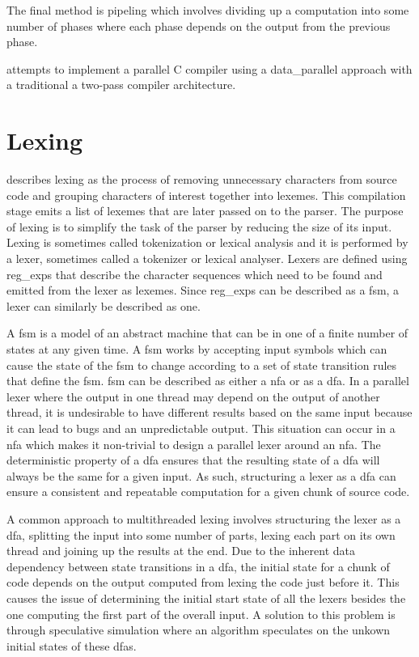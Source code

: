 The final method is pipeling which involves dividing up a computation into some
number of phases where each phase depends on the output from the previous phase.

\cite{mark_thierry_vandevoorde_parallel_1988} attempts to implement a parallel
C compiler using a \gls{data_parallel} approach with a traditional a two-pass
compiler architecture.

\section{Lexing} \label{lit_review_lexing}

\cite{scott_programming_2015} describes lexing as the process of removing
unnecessary characters from source code and grouping characters of interest
together into lexemes. This compilation stage emits a list of lexemes that are
later passed on to the parser. The purpose of lexing is to simplify the task
of the parser by reducing the size of its input. Lexing is sometimes  called
tokenization or lexical analysis and it is performed by a lexer, sometimes
called a tokenizer or lexical analyser. Lexers are defined using \glspl{reg_exp}
that describe the character sequences which need to be found and emitted from
the lexer as lexemes. Since \glspl{reg_exp} can be described as a \gls{fsm}, a
lexer can similarly be described as one.

A \gls{fsm} is a model of an abstract machine that can be in one of a finite
number of states at any given time. A \gls{fsm} works by accepting input symbols
which can cause the state of the \gls{fsm} to change according to a set of
state transition rules that define the \gls{fsm}. \gls{fsm} can be described
as either a \gls{nfa} or as a \gls{dfa}. In a parallel lexer where the output
in one thread may depend on the output of another thread, it is undesirable to
have different results based on the same input because it can lead to bugs and
an unpredictable output. This situation can occur in a \gls{nfa} which makes
it non-trivial to design a parallel lexer around an \gls{nfa}. The deterministic
property of a \gls{dfa} ensures that the resulting state of a
\gls{dfa} will always be the same for a given input.  As such, structuring a
lexer as a \gls{dfa} can ensure a consistent and repeatable computation for a
given chunk of source code.

A common approach to multithreaded lexing involves structuring the lexer as a
\gls{dfa}, splitting the input into some number of parts, lexing each part on
its own thread and joining up the results at the end. Due to the inherent data
dependency between state transitions in a \gls{dfa}, the initial state for a
chunk of code depends on the output computed from lexing the code just before
it. This causes the issue of determining the initial start state of all the
lexers besides the one computing the first part of the overall input. A solution
to this problem is through speculative simulation where an algorithm speculates
on the unkown initial states of these \gls{dfa}s.

